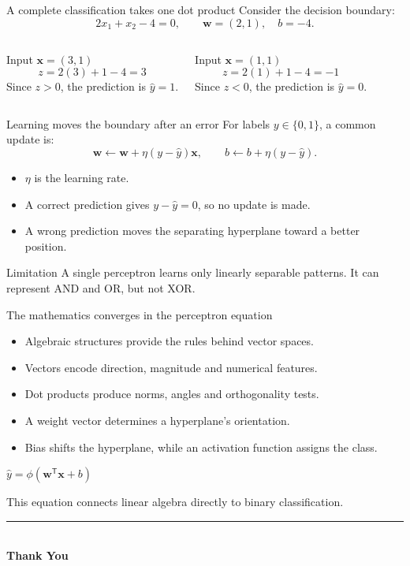 \documentclass[aspectratio=169,11pt]{beamer}
\newcommand{\keyeq}[1]{%
  \begin{center}
  \setlength{\fboxsep}{9pt}%
  {\color{navy}$\displaystyle #1$}
  \end{center}}
\begin{document}
\begin{frame}{A complete classification takes one dot product}
Consider the decision boundary:
\[
2x_1+x_2-4=0,
\qquad \bm w=(2,1),\quad b=-4.
\]
\begin{columns}[T,onlytextwidth]
\begin{block}{Input $\bm x=(3,1)$}
\[
z=2(3)+1-4=3
\]
Since $z>0$, the prediction is $\hat y=1$.
\end{block}
\begin{exampleblock}{Input $\bm x=(1,1)$}
\[
z=2(1)+1-4=-1
\]
Since $z<0$, the prediction is $\hat y=0$.
\end{exampleblock}
\end{columns}
\end{frame}

\begin{frame}{Learning moves the boundary after an error}
For labels $y\in\{0,1\}$, a common update is:
\[
\bm w\leftarrow\bm w+\eta(y-\hat y)\bm x,
\qquad
b\leftarrow b+\eta(y-\hat y).
\]
\begin{itemize}
  \item $\eta$ is the learning rate.
  \item A correct prediction gives $y-\hat y=0$, so no update is made.
  \item A wrong prediction moves the separating hyperplane toward a better position.
\end{itemize}
\begin{alertblock}{Limitation}
A single perceptron learns only linearly separable patterns. It can represent AND and OR, but not XOR.
\end{alertblock}
\end{frame}

\begin{frame}{The mathematics converges in the perceptron equation}
\begin{itemize}
  \item Algebraic structures provide the rules behind vector spaces.
  \item Vectors encode direction, magnitude and numerical features.
  \item Dot products produce norms, angles and orthogonality tests.
  \item A weight vector determines a hyperplane's orientation.
  \item Bias shifts the hyperplane, while an activation function assigns the class.
\end{itemize}
\vspace{0.35cm}
\keyeq{\boxed{\hat y=\phi(\bm w^{\mathsf T}\bm x+b)}}
\begin{center}
\color{muted}This equation connects linear algebra directly to binary classification.
\end{center}
\end{frame}


\begin{frame}[plain]
\begin{center}
\vspace{1.3cm}
  {\color{navy}\rule{2.0cm}{1.5pt}}\\[0.55cm]
{\fontsize{34}{38}\selectfont\bfseries\color{navy}Thank You}\\[0.45cm]
\end{center}
\end{frame}
\end{document}

